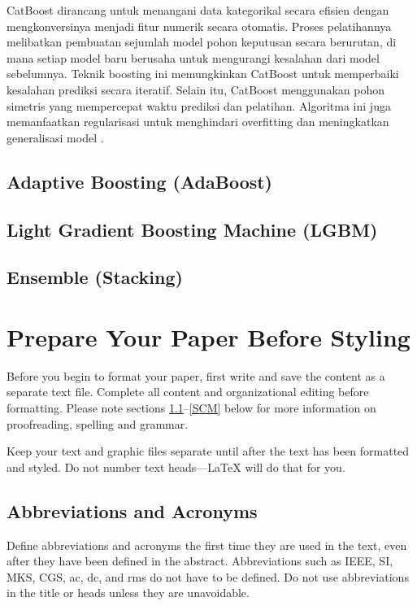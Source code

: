 \documentclass[conference]{IEEEtran}
\begin{document}
CatBoost dirancang untuk menangani data kategorikal secara efisien dengan mengkonversinya menjadi fitur numerik secara otomatis. Proses pelatihannya 
melibatkan pembuatan sejumlah model pohon keputusan secara berurutan, di mana setiap model baru berusaha untuk mengurangi kesalahan dari model sebelumnya. 
Teknik boosting ini memungkinkan CatBoost untuk memperbaiki kesalahan prediksi secara iteratif. Selain itu, CatBoost menggunakan pohon simetris yang mempercepat 
waktu prediksi dan pelatihan. Algoritma ini juga memanfaatkan regularisasi untuk menghindari overfitting dan meningkatkan generalisasi model \cite{b29}.

\subsection{Adaptive Boosting (AdaBoost)}

\subsection{Light Gradient Boosting Machine (LGBM)}

\subsection{Ensemble (Stacking)}

\section{Prepare Your Paper Before Styling}
Before you begin to format your paper, first write and save the content as a 
separate text file. Complete all content and organizational editing before 
formatting. Please note sections \ref{AA}--\ref{SCM} below for more information on 
proofreading, spelling and grammar.

Keep your text and graphic files separate until after the text has been 
formatted and styled. Do not number text heads---{\LaTeX} will do that 
for you.

\subsection{Abbreviations and Acronyms}\label{AA}
Define abbreviations and acronyms the first time they are used in the text, 
even after they have been defined in the abstract. Abbreviations such as 
IEEE, SI, MKS, CGS, ac, dc, and rms do not have to be defined. Do not use 
abbreviations in the title or heads unless they are unavoidable.
\end{document}
